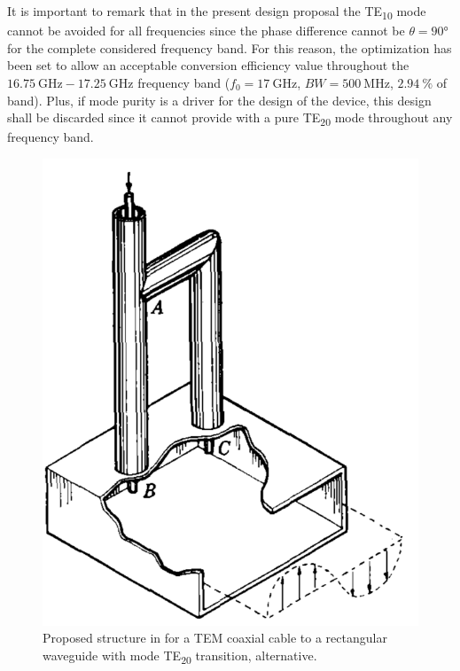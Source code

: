 \documentclass[english,twoside]{article}
\begin{document}
		It is important to remark that in the present design proposal the \ac{TE}\textsubscript{10} mode cannot be avoided for all frequencies since the phase difference cannot be $\theta=\ang{90}$ for the complete considered frequency band. For this reason, the optimization has been set to allow an acceptable conversion efficiency value throughout the $\SI{16.75}{\giga\hertz}-\SI{17.25}{\giga\hertz}$ frequency band ($f_0 = \SI{17}{\giga\hertz}$, $BW=\SI{500}{\mega\hertz}$, $\SI{2.94}{\percent}$ of band). Plus, if mode purity is a driver for the design of the device, this design shall be discarded since it cannot provide with a pure \ac{TE}\textsubscript{20} mode throughout any frequency band.
		
		\begin{figure}[H]
			\centering
			\includegraphics[width=.5\textwidth]{figures/book_coax2wrte20_b}
			\caption{Proposed structure in \cite{montgomery} for a TEM coaxial cable to a rectangular waveguide with mode TE\textsubscript{20} transition, alternative.}
			\label{fig:book_coax2wrte20_b}
		\end{figure}
	
\end{document}
